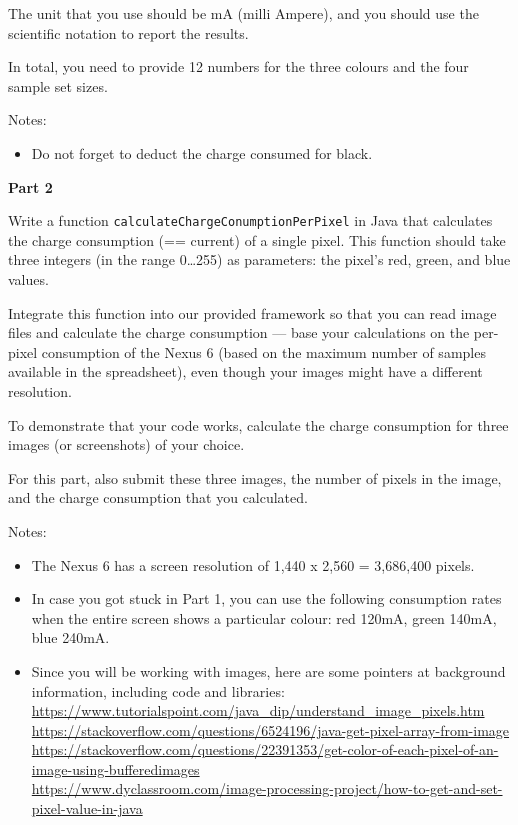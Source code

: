 \documentclass{pracs}
\begin{document}
The unit that you use should be mA (milli Ampere), and you should use the scientific notation to report the results.

In total, you need to provide 12 numbers for the three colours and the four sample set sizes.

Notes:
\begin{itemize}
\item Do not forget to deduct the charge consumed for black.
\end{itemize}

\noindent\textbf{Part 2}

Write a function \texttt{calculateChargeConumptionPerPixel} in Java that calculates the charge consumption (== current) of a single pixel. This function should take three integers (in the range 0\ldots255) as parameters: the pixel's red, green, and blue values.

Integrate this function into our provided framework so that you can read image files and calculate the charge consumption --- base your calculations on the per-pixel consumption of the Nexus 6 (based on the maximum number of samples available in the spreadsheet), even though your images might have a different resolution. 

To demonstrate that your code works, calculate the charge consumption for three images (or screenshots) of your choice. 

For this part, also submit these three images, the number of pixels in the image, and the charge consumption that you calculated.

Notes:
\begin{itemize}
\item The Nexus 6 has a screen resolution of 1,440 x 2,560 = 3,686,400 pixels. 
\item In case you got stuck in Part 1, you can use the following consumption rates when the entire screen shows a particular colour: red 120mA, green 140mA, blue 240mA.
\item Since you will be working with images, here are some pointers at background information, including code and libraries: \\
\url{https://www.tutorialspoint.com/java_dip/understand_image_pixels.htm}\\
\url{https://stackoverflow.com/questions/6524196/java-get-pixel-array-from-image}\\
\url{https://stackoverflow.com/questions/22391353/get-color-of-each-pixel-of-an-image-using-bufferedimages}\\
\url{https://www.dyclassroom.com/image-processing-project/how-to-get-and-set-pixel-value-in-java}

\end{itemize}
\end{document}
